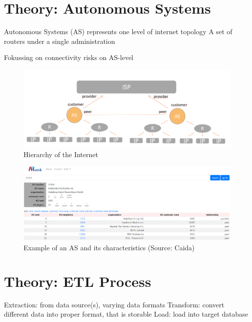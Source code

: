 \documentclass[conference]{IEEEtran}
\begin{document}
\section{Theory: Autonomous Systems}

Autonomous Systems (AS) represents one level of internet topology
A set of routers under a single administration


Fokussing on connectivity risks on AS-level 






\begin{figure}[htbp]
\centerline{\includegraphics[scale=0.25]{Graphics/hierarchy.PNG}}
\caption{Hierarchy of the Internet}
\label{fig}
\end{figure}

\begin{figure}[htbp]
\centerline{\includegraphics[scale=0.15]{Graphics/asExample.PNG}}
\caption{Example of an AS and its characteristics (Source: Caida)}
\label{fig}
\end{figure}



\section{Theory: ETL Process}

Extraction: from data source(s), varying data formats
Transform: convert different data into proper format, that is storable
Load: load into target database
\end{document}
